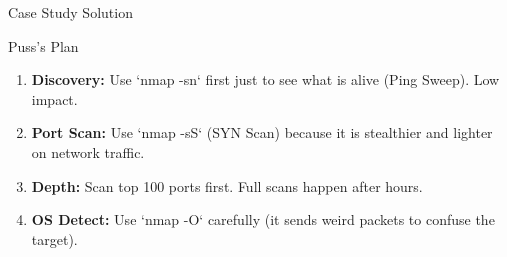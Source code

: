\documentclass[aspectratio=169]{beamer}  %
\begin{document}
\begin{frame}{Case Study Solution}
    \begin{exampleblock}{Puss's Plan}
        \footnotesize
        \begin{enumerate}
            \item \textbf{Discovery:} Use `nmap -sn` first just to see what is alive (Ping Sweep). Low impact.
            \item \textbf{Port Scan:} Use `nmap -sS` (SYN Scan) because it is stealthier and lighter on network traffic.
            \item \textbf{Depth:} Scan top 100 ports first. Full scans happen after hours.
            \item \textbf{OS Detect:} Use `nmap -O` carefully (it sends weird packets to confuse the target).
        \end{enumerate}
    \end{exampleblock}
    \begin{center}
    \end{center}
\end{frame}

\end{document}
